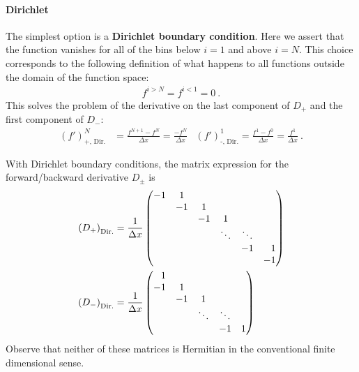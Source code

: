 \documentclass[12pt, oneside]{report}    %
\begin{document}
\paragraph{Dirichlet}
The simplest option is a \textbf{Dirichlet boundary condition}. Here we assert that the function vanishes for all of the bins below $i=1$ and above $i=N$. This choice corresponds to the following definition of what happens to all functions outside the domain of the function space:
\begin{align}
  f^{i > N} = f^{i < 1} = 0 \ .
\end{align}
This solves the problem of the derivative on the last component of $D_+$ and the first component of $D_-$:
\begin{align}
  (f')^N_\text{+, Dir.} &= \frac{f^{N+1} - f^N}{\Delta x} 
  = 
  \frac{- f^N}{\Delta x}  
  &
 (f')^1_\text{-, Dir.} = \frac{f^{1} - f^0}{\Delta x} 
  = 
  \frac{f^1}{\Delta x}
  \ .
\end{align}
\begin{example}
With Dirichlet boundary conditions, the matrix expression for the forward/backward derivative $D_\pm$ is
\begin{align}
    \left(D_+\right)_\text{Dir.}
    &=
    \frac{1}{\Delta x}
    \begin{pmatrix}
        -1 & 1 & & &  \\
        & -1 & 1 & &  \\
        & & -1 & 1 &  \\
        & & & \ddots & \ddots &  \\
        & & & & -1 & \pp 1 \\
        & & & & & -1 
    \end{pmatrix}
    \\
    \left(D_-\right)_\text{Dir.}
    &=
    \frac{1}{\Delta x}
    \begin{pmatrix}
        \pp 1 & & & &  \\
         -1 & 1 & &  \\
        & -1 & 1 &  \\
         & & \ddots & \ddots &  \\
        & & & -1 &  1 
    \end{pmatrix}
\end{align}
Observe that neither of these matrices is Hermitian in the conventional finite dimensional sense.
\end{example}
\end{document}
